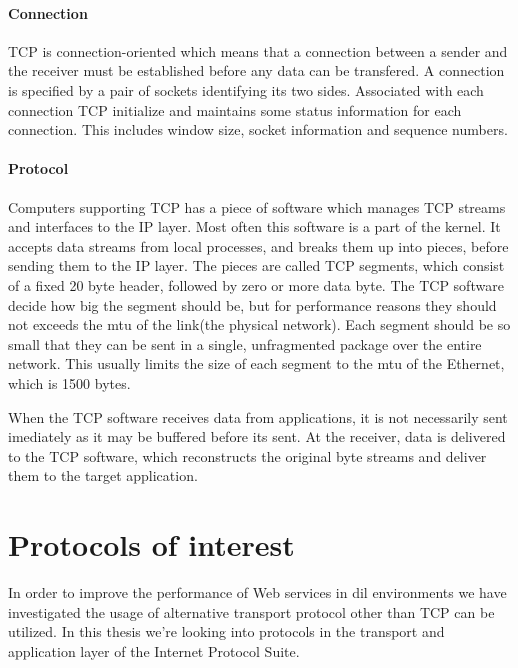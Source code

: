 \paragraph{Connection}

TCP is connection-oriented which means that a connection between a sender and
the receiver must be established before any data can be transfered. A connection
is specified by a pair of sockets identifying its two sides. Associated with
each connection TCP initialize and maintains some status information for each
connection. This includes window size, socket information and sequence numbers.

\paragraph{Protocol}

Computers supporting TCP has a piece of software which manages TCP streams and
interfaces to the IP layer. Most often this software is a part of the
kernel\cite{computer-networks}. It accepts data streams from local processes,
and breaks them up into pieces, before sending them to the IP layer. The pieces
are called TCP segments, which consist of a fixed 20 byte header, followed by
zero or more data byte. The TCP software decide how big the segment should be,
but for performance reasons they should not exceeds the \gls{mtu} of the
link(the physical network). Each segment should be so small that they can be
sent in a single, unfragmented package over the entire network. This usually
limits the size of each segment to the \gls{mtu} of the Ethernet, which is 1500
bytes.

When the TCP software receives data from applications, it is not necessarily
sent imediately as it may be buffered before its sent. At the receiver, data is
delivered to the TCP software, which reconstructs the original byte streams and
deliver them to the target application.


\section{Protocols of interest}


In order to improve the performance of Web services in \gls{dil} environments we
have investigated the usage of alternative transport protocol other than TCP can
be utilized. In this thesis we're looking into protocols in the transport and
application layer of the Internet Protocol Suite\cite{rfc-1122}.

